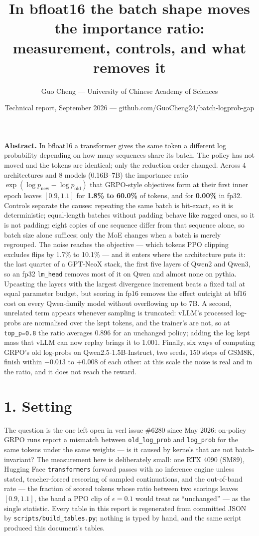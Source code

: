 \documentclass[
  10pt,
]{article}
\title{In bfloat16 the batch shape moves the importance ratio:
measurement, controls, and what removes it}
\author{Guo Cheng --- University of Chinese Academy of Sciences}
\date{Technical report, September 2026 ---
github.com/GuoCheng24/batch-logprob-gap}
\begin{document}
\maketitle

\textbf{Abstract.} In bfloat16 a transformer gives the same token a
different log probability depending on how many sequences share its
batch. The policy has not moved and the tokens are identical; only the
reduction order changed. Across 4 architectures and 8 models (0.16B--7B)
the importance ratio \(\exp(\log p_{\text{new}} - \log p_{\text{old}})\)
that GRPO-style objectives form at their first inner epoch leaves
\([0.9, 1.1]\) for \textbf{1.8\% to 60.0\%} of tokens, and for
\textbf{0.00\%} in fp32. Controls separate the causes: repeating the
same batch is bit-exact, so it is deterministic; equal-length batches
without padding behave like ragged ones, so it is not padding; eight
copies of one sequence differ from that sequence alone, so batch size
alone suffices; only the MoE changes when a batch is merely regrouped.
The noise reaches the objective --- which tokens PPO clipping excludes
flips by 1.7\% to 10.1\% --- and it enters where the architecture puts
it: the last quarter of a GPT-NeoX stack, the first five layers of Qwen2
and Qwen3, so an fp32 \texttt{lm\_head} removes most of it on Qwen and
almost none on pythia. Upcasting the layers with the largest divergence
increment beats a fixed tail at equal parameter budget, but scoring in
fp16 removes the effect outright at bf16 cost on every Qwen-family model
without overflowing up to 7B. A second, unrelated term appears whenever
sampling is truncated: vLLM's processed log-probs are normalised over
the kept tokens, and the trainer's are not, so at \texttt{top\_p=0.8}
the ratio averages 0.896 for an unchanged policy; adding the log kept
mass that vLLM can now replay brings it to 1.001. Finally, six ways of
computing GRPO's old log-probs on Qwen2.5-1.5B-Instruct, two seeds, 150
steps of GSM8K, finish within \(-0.013\) to \(+0.008\) of each other: at
this scale the noise is real and in the ratio, and it does not reach the
reward.

\hypertarget{setting}{%
\section{1. Setting}\label{setting}}

The question is the one left open in verl issue \#6280 since May 2026:
on-policy GRPO runs report a mismatch between \texttt{old\_log\_prob}
and \texttt{log\_prob} for the same tokens under the same weights --- is
it caused by kernels that are not batch-invariant? The measurement here
is deliberately small: one RTX 4090 (SM89), Hugging Face
\texttt{transformers} forward passes with no inference engine unless
stated, teacher-forced rescoring of sampled continuations, and the
out-of-band rate --- the fraction of scored tokens whose ratio between
two scorings leaves \([0.9, 1.1]\), the band a PPO clip of
\(\epsilon = 0.1\) would treat as ``unchanged'' --- as the single
statistic. Every table in this report is regenerated from committed JSON
by \texttt{scripts/build\_tables.py}; nothing is typed by hand, and the
same script produced this document's tables.
\end{document}
